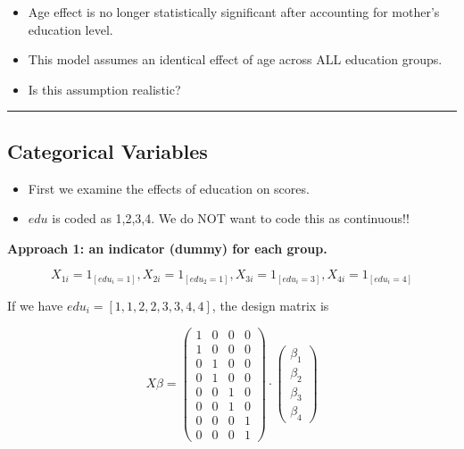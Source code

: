 \documentclass[
  letterpaper,
  DIV=11,
  numbers=noendperiod]{scrreprt}
\providecommand{\tightlist}{%
  \setlength{\itemsep}{0pt}\setlength{\parskip}{0pt}}\usepackage{longtable,booktabs,array}
\begin{document}
\begin{itemize}
\tightlist
\item
  Age effect is no longer statistically significant after accounting for
  mother's education level.
\item
  This model assumes an identical effect of age across ALL education
  groups.
\item
  Is this assumption realistic?
\end{itemize}

\begin{center}\rule{0.5\linewidth}{0.5pt}\end{center}

\hypertarget{categorical-variables}{%
\subsection*{Categorical Variables}\label{categorical-variables}}

\begin{itemize}
\item
  First we examine the effects of education on scores.
\item
  \(edu\) is coded as 1,2,3,4. We do NOT want to code this as
  continuous!!
\end{itemize}

\textbf{Approach 1: an indicator (dummy) for each group.}

\[
X_{1i} = 1_{[edu_i=1]}, X_{2i} = 1_{[edu_2=1]}, X_{3i} = 1_{[edu_i=3]}, X_{4i} = 1_{[edu_i=4]}
\]

If we have \(edu_i = [1,1,2,2,3,3,4,4]\), the design matrix is

\[
X\beta = \begin{pmatrix} 
1 & 0 & 0 & 0\\
1 & 0 & 0 & 0\\
0 & 1 & 0 & 0\\ 
0 & 1 & 0 & 0\\
0 & 0 & 1 & 0\\
0 & 0 & 1 & 0\\
0 & 0 & 0 & 1\\
0 & 0 & 0 & 1
\end{pmatrix} \cdot \begin{pmatrix} \beta_1 \\ \beta_2 \\ \beta_3 \\ \beta_4 \end{pmatrix}
\]
\end{document}
